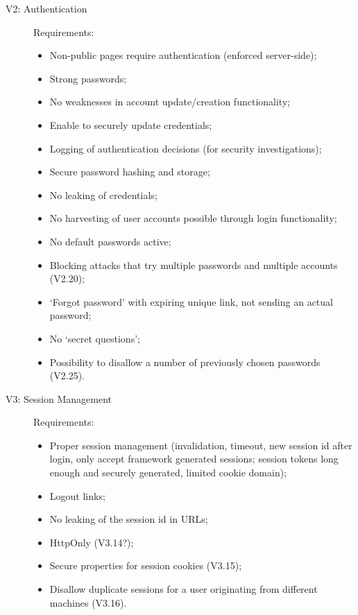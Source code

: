 \documentclass[a4paper]{report}
\begin{document}
\begin{description}
\item[V2: Authentication] Requirements:
\begin{itemize}
\item Non-public pages require authentication (enforced server-side); 
\item Strong passwords; 
\item No weaknesses in account update/creation functionality; 
\item Enable to securely update credentials; 
\item Logging of authentication decisions (for security investigations);
\item Secure password hashing and storage;
\item No leaking of credentials;
\item No harvesting of user accounts possible through login functionality;
\item No default passwords active;
\item Blocking attacks that try multiple passwords and multiple accounts (V2.20);
\item `Forgot password' with expiring unique link, not sending an actual password;
\item No `secret questions';
\item Possibility to disallow a number of previously chosen passwords (V2.25).
\end{itemize}

\item[V3: Session Management] Requirements:
\begin{itemize}
\item Proper session management (invalidation, timeout, new session id after login,
only accept framework generated sessions; session tokens long enough and securely generated,
limited cookie domain);
\item Logout links;
\item No leaking of the session id in URLs;
\item HttpOnly (V3.14?);
\item Secure properties for session cookies (V3.15);
\item Disallow duplicate sessions for a user originating from different machines (V3.16).
\end{itemize}


\end{description}
\end{document}
